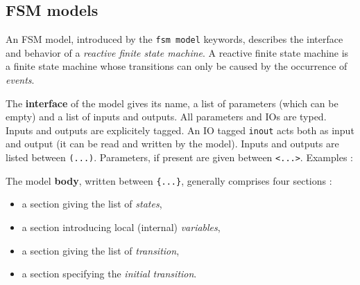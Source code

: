 \subsection{FSM models}
\label{sec:fsm-models}

An FSM model, introduced by the \verb|fsm model| keywords, describes the interface and behavior of a
\emph{reactive finite state machine}. A reactive finite state machine is a finite state machine
whose transitions can only be caused by the occurrence of \emph{events}.

\begin{center}
\end{center}

\medskip
The \textbf{interface} of the model gives its name, a list of parameters (which can be empty) and a
list of inputs and outputs. All parameters and IOs are typed. Inputs and outputs are explicitely
tagged. An IO tagged \verb|inout| acts both as input and output (it can be read and written by the
model). Inputs and outputs are listed between \verb|(...)|. Parameters, if present are given between
\verb|<...>|. Examples :

\begin{center}
\end{center}

\begin{center}
\end{center}

\begin{center}
\end{center}

\medskip
The model \textbf{body}, written between \verb|{...}|, generally comprises four sections :
\begin{itemize}
\item a section giving the list of \emph{states},
\item a section introducing local (internal) \emph{variables},
\item a section giving the list of \emph{transition},
\item a section specifying the \emph{initial transition}.
\end{itemize}

